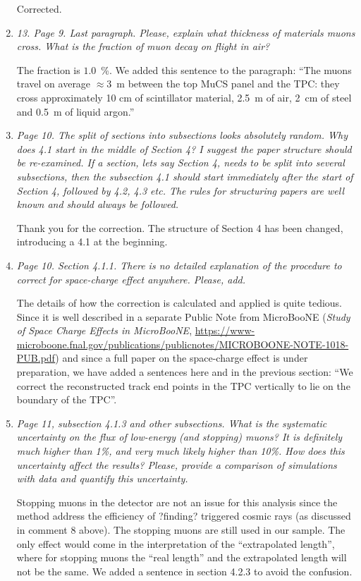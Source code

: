 \documentclass[review,number,sort&compress]{article}
\begin{document}
\begin{enumerate}
Corrected.

\item \emph{13. Page 9. Last paragraph.
Please, explain what thickness of materials muons cross. What is the fraction of muon decay on flight in air?}

The fraction is $1.0$~\%. We added this sentence to the paragraph: ``The muons travel on average $\approx3$~m between the top MuCS panel and the TPC: they cross approximately 10 cm of scintillator material, 2.5~m of air, 2~cm of steel and 0.5~m of liquid argon.''

\item \emph{Page 10. The split of sections into subsections looks absolutely random. Why does 4.1 start in the middle of Section 4?
I suggest the paper structure should be re-examined. If a section, lets say Section 4, needs to be split into several subsections, then the subsection 4.1 should start immediately after the start of Section 4, followed by 4.2, 4.3 etc. The rules for structuring papers are well known and should always be followed.}

Thank you for the correction. The structure of Section 4 has been changed, introducing a 4.1 at the beginning.

\item \emph{Page 10. Section 4.1.1.
There is no detailed explanation of the procedure to correct for space-charge effect anywhere. Please, add.}

The details of how the correction is calculated and applied is quite tedious. Since it is well described in a separate Public Note from MicroBooNE (\textit{Study of Space Charge Effects in MicroBooNE}, \url{https://www-microboone.fnal.gov/publications/publicnotes/MICROBOONE-NOTE-1018-PUB.pdf}) and 
since a full paper on the space-charge effect is under preparation, we have added a sentences here and in the previous section: ``We correct the reconstructed track end points in the TPC vertically to lie on the boundary of the TPC''.

\item \emph{Page 11, subsection 4.1.3 and other subsections.
What is the systematic uncertainty on the flux of low-energy (and stopping) muons? It is definitely much higher than 1\%, and very much likely higher than 10\%. How does this uncertainty affect the results? Please, provide a comparison of simulations with data and quantify this uncertainty.}

Stopping muons in the detector are not an issue for this analysis since
the method address the efficiency of ?finding?  triggered cosmic rays (as discussed in comment 8 above). The stopping muons are still used in our sample. The only effect would come in the interpretation of the ``extrapolated length'', where for stopping muons the ``real length'' and the extrapolated length will not be the same. We added a sentence in section 4.2.3 to avoid the confusion.



\end{enumerate}
\end{document}
